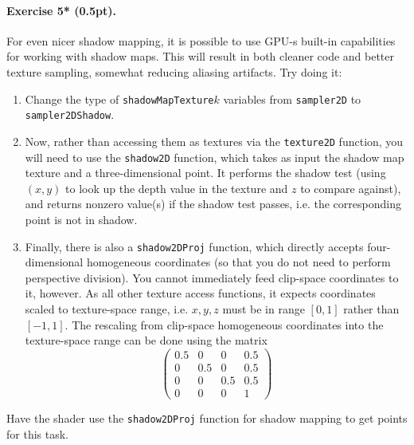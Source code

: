 \documentclass{article}
\newenvironment{exercise}[2]{\paragraph{Exercise #1 (#2pt).} }{
\medskip}
\begin{document}
\begin{exercise}{5*}{0.5}
For even nicer shadow mapping, it is possible to use GPU-s built-in capabilities for working with shadow maps. This will result in both cleaner code and better texture sampling, somewhat reducing aliasing artifacts. Try doing it:
\begin{enumerate}
\item Change the type of \texttt{shadowMapTexture}$k$ variables from \texttt{sampler2D} to \texttt{sampler2DShadow}.
\item Now, rather than accessing them as textures via the \texttt{texture2D} function, you will need to use the \texttt{shadow2D} function, which takes as input the shadow map texture and a three-dimensional point. It performs the shadow test (using $(x, y)$ to look up the depth value in the texture and $z$ to compare against), and returns nonzero value(s) if the shadow test passes, i.e. the corresponding point is not in shadow.
\item Finally, there is also a \texttt{shadow2DProj} function, which directly accepts four-dimensional homogeneous coordinates (so that you do not need to perform perspective division). You cannot immediately feed clip-space coordinates to it, however. As all other texture access functions, it expects coordinates scaled to texture-space range, i.e. $x, y, z$ must be in range $[0, 1]$ rather than $[-1, 1]$. The rescaling from clip-space homogeneous coordinates into the texture-space range can be done using the matrix
$$
\left(\begin{matrix}0.5 & 0 & 0 & 0.5\\
0 & 0.5 & 0 & 0.5 \\
0 & 0 & 0.5 & 0.5 \\
0 & 0& 0& 1\end{matrix}\right)
$$
\end{enumerate}
Have the shader use the \texttt{shadow2DProj} function for shadow mapping to get points for this task.
\end{exercise}
\end{document}
